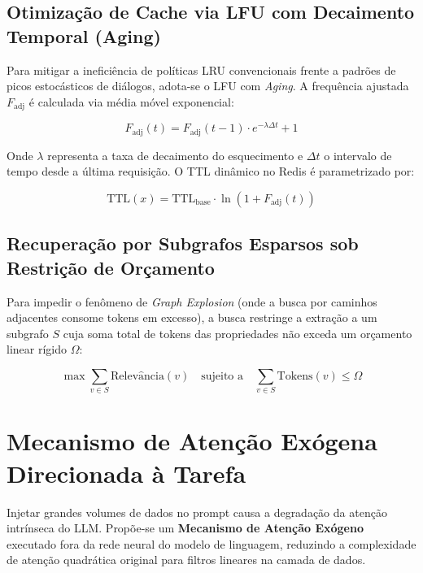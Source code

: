 \documentclass[11pt,a4paper]{article}
\begin{document}
\subsection{Otimização de Cache via LFU com Decaimento Temporal (Aging)}

Para mitigar a ineficiência de políticas LRU convencionais frente a padrões de picos estocásticos
de diálogos, adota-se o LFU com \textit{Aging}. A frequência ajustada $F_{\text{adj}}$ é
calculada via média móvel exponencial:

\begin{equation}
F_{\text{adj}}(t) = F_{\text{adj}}(t-1) \cdot e^{-\lambda \Delta t} + 1
\end{equation}

Onde $\lambda$ representa a taxa de decaimento do esquecimento e $\Delta t$ o intervalo de tempo
desde a última requisição. O TTL dinâmico no Redis é parametrizado por:

\begin{equation}
\text{TTL}(x) = \text{TTL}_{\text{base}} \cdot \ln\!\left(1 + F_{\text{adj}}(t)\right)
\end{equation}

\subsection{Recuperação por Subgrafos Esparsos sob Restrição de Orçamento}

Para impedir o fenômeno de \textit{Graph Explosion} (onde a busca por caminhos adjacentes consome
tokens em excesso), a busca restringe a extração a um subgrafo $S$ cuja soma total de tokens das
propriedades não exceda um orçamento linear rígido $\Omega$:

\begin{equation}
\max \sum_{v \in S} \mathrm{Relev\hat{a}ncia}(v)
\quad \text{sujeito a} \quad
\sum_{v \in S} \mathrm{Tokens}(v) \le \Omega
\end{equation}


\section{Mecanismo de Atenção Exógena Direcionada à Tarefa}

Injetar grandes volumes de dados no prompt causa a degradação da atenção intrínseca do LLM.
Propõe-se um \textbf{Mecanismo de Atenção Exógeno} executado fora da rede neural do modelo de
linguagem, reduzindo a complexidade de atenção quadrática original para filtros lineares na camada
de dados.
\end{document}
